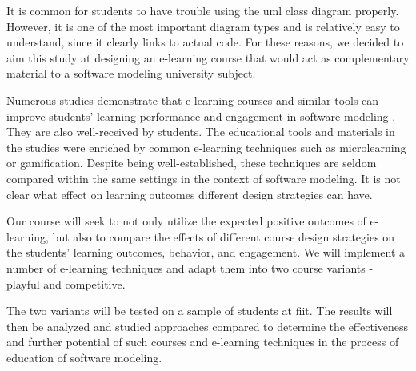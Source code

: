 It is common for students to have trouble using the \ac{uml} class diagram properly. However, it is one of the most important diagram types and is relatively easy to understand, since it clearly links to actual code. For these reasons, we decided to aim this study at designing an e-learning course that would act as complementary material to a software modeling university subject. 

Numerous studies demonstrate that e-learning courses and similar tools can improve students' learning performance and engagement in software modeling \cite{ramle2021uml}\cite{jurgelaitis2019implementing}\cite{cagnazzo2023umlegend}. They are also well-received by students. The educational tools and materials in the studies were enriched by common e-learning techniques such as microlearning or gamification. Despite being well-established, these techniques are seldom compared within the same settings in the context of software modeling. It is not clear what effect on learning outcomes different design strategies can have.

Our course will seek to not only utilize the expected positive outcomes of e-learning, but also to compare the effects of different course design strategies on the students' learning outcomes, behavior, and engagement. We will implement a number of e-learning techniques and adapt them into two course variants - playful and competitive.

The two variants will be tested on a sample of students at \ac{fiit}. The results will then be analyzed and studied approaches compared to determine the effectiveness and further potential of such courses and e-learning techniques in the process of education of software modeling. 






